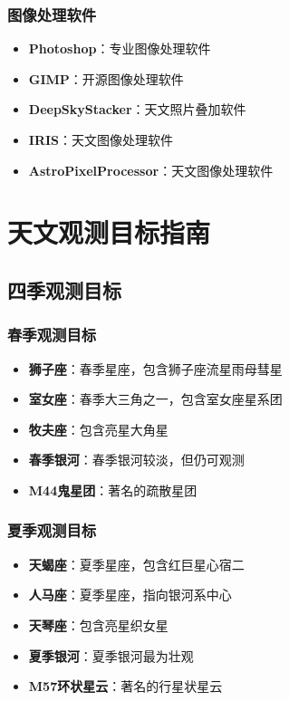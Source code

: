 \documentclass[12pt,UTF8]{ctexbook}
\begin{document}
\section{图像处理软件}

\begin{itemize}
  \item \textbf{Photoshop}：专业图像处理软件
  \item \textbf{GIMP}：开源图像处理软件
  \item \textbf{DeepSkyStacker}：天文照片叠加软件
  \item \textbf{IRIS}：天文图像处理软件
  \item \textbf{AstroPixelProcessor}：天文图像处理软件
\end{itemize}

\part{天文观测目标指南}

\chapter{四季观测目标}
\section{春季观测目标}

\begin{itemize}
  \item \textbf{狮子座}：春季星座，包含狮子座流星雨母彗星
  \item \textbf{室女座}：春季大三角之一，包含室女座星系团
  \item \textbf{牧夫座}：包含亮星大角星
  \item \textbf{春季银河}：春季银河较淡，但仍可观测
  \item \textbf{M44鬼星团}：著名的疏散星团
\end{itemize}

\section{夏季观测目标}

\begin{itemize}
  \item \textbf{天蝎座}：夏季星座，包含红巨星心宿二
  \item \textbf{人马座}：夏季星座，指向银河系中心
  \item \textbf{天琴座}：包含亮星织女星
  \item \textbf{夏季银河}：夏季银河最为壮观
  \item \textbf{M57环状星云}：著名的行星状星云
\end{itemize}
\end{document}
